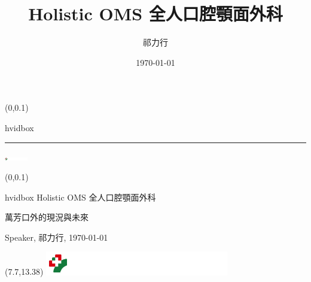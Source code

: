 \documentclass[t,24pt,aspectratio=169]{beamer}
\title{Holistic OMS 全人口腔顎面外科}
\date[today]{\today}
\author[Name]{祁力行}
\institute[Oral and Maxillofacial Surgery]{Wan Fang Hospital, Taipei Medical University, Taipei 116, Taiwan}
\begin{document}
{
\begin{frame}
    \begin{textblock*}{\textwidth}(0\textwidth,0.1\textheight)
        \begin{beamercolorbox}[wd=7.8cm,ht=7.3cm,sep=0.5cm]{hvidbox}
            \fontsize{5}{10}\selectfont {}
            \noindent\textcolor{KUrod}{\rule{6.8cm}{0.4pt}}
        \end{beamercolorbox}
        \includegraphics[width=1cm]{KU/TMWH_logo.png}
    \end{textblock*}
    \begin{textblock*}{\textwidth}(0\textwidth,0.1\textheight)
        \begin{beamercolorbox}[wd=7.8cm,sep=0.5cm]{hvidbox}
                \Huge \textcolor{KUrod}{Holistic OMS 全人口腔顎面外科}
                \vspace{0.5cm}
                \par
                \Large 萬芳口外的現況與未來
                \vspace{0.5cm}
                \par
                \normalsize Speaker, 祁力行, \today
        \end{beamercolorbox}
    \end{textblock*}
    \begin{textblock}{1}(7.7,13.38) %
        \includegraphics[width=8cm]{KU/TMWH_logo.png}
    \end{textblock}
\end{frame}
}
\end{document}
